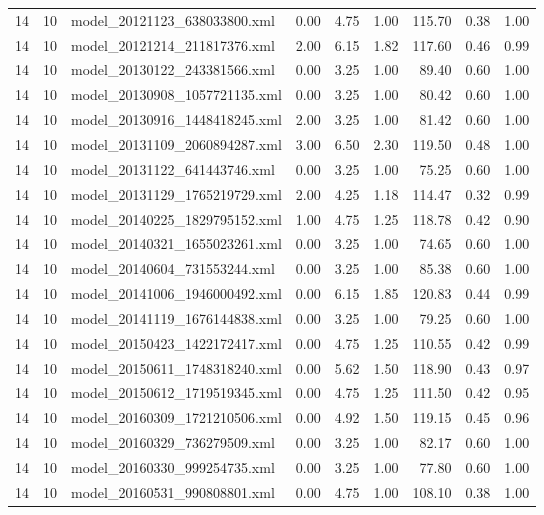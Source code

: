 \begin{table}[ht]
\begin{tabular}{rrlrrrrrr}
   14 &  10 & model\_20121123\_638033800.xml & 0.00 & 4.75 & 1.00 & 115.70 & 0.38 & 1.00 \\ 
   14 &  10 & model\_20121214\_211817376.xml & 2.00 & 6.15 & 1.82 & 117.60 & 0.46 & 0.99 \\ 
   14 &  10 & model\_20130122\_243381566.xml & 0.00 & 3.25 & 1.00 & 89.40 & 0.60 & 1.00 \\ 
   14 &  10 & model\_20130908\_1057721135.xml & 0.00 & 3.25 & 1.00 & 80.42 & 0.60 & 1.00 \\ 
   14 &  10 & model\_20130916\_1448418245.xml & 2.00 & 3.25 & 1.00 & 81.42 & 0.60 & 1.00 \\ 
   14 &  10 & model\_20131109\_2060894287.xml & 3.00 & 6.50 & 2.30 & 119.50 & 0.48 & 1.00 \\ 
   14 &  10 & model\_20131122\_641443746.xml & 0.00 & 3.25 & 1.00 & 75.25 & 0.60 & 1.00 \\ 
   14 &  10 & model\_20131129\_1765219729.xml & 2.00 & 4.25 & 1.18 & 114.47 & 0.32 & 0.99 \\ 
   14 &  10 & model\_20140225\_1829795152.xml & 1.00 & 4.75 & 1.25 & 118.78 & 0.42 & 0.90 \\ 
   14 &  10 & model\_20140321\_1655023261.xml & 0.00 & 3.25 & 1.00 & 74.65 & 0.60 & 1.00 \\ 
   14 &  10 & model\_20140604\_731553244.xml & 0.00 & 3.25 & 1.00 & 85.38 & 0.60 & 1.00 \\ 
   14 &  10 & model\_20141006\_1946000492.xml & 0.00 & 6.15 & 1.85 & 120.83 & 0.44 & 0.99 \\ 
   14 &  10 & model\_20141119\_1676144838.xml & 0.00 & 3.25 & 1.00 & 79.25 & 0.60 & 1.00 \\ 
   14 &  10 & model\_20150423\_1422172417.xml & 0.00 & 4.75 & 1.25 & 110.55 & 0.42 & 0.99 \\ 
   14 &  10 & model\_20150611\_1748318240.xml & 0.00 & 5.62 & 1.50 & 118.90 & 0.43 & 0.97 \\ 
   14 &  10 & model\_20150612\_1719519345.xml & 0.00 & 4.75 & 1.25 & 111.50 & 0.42 & 0.95 \\ 
   14 &  10 & model\_20160309\_1721210506.xml & 0.00 & 4.92 & 1.50 & 119.15 & 0.45 & 0.96 \\ 
   14 &  10 & model\_20160329\_736279509.xml & 0.00 & 3.25 & 1.00 & 82.17 & 0.60 & 1.00 \\ 
   14 &  10 & model\_20160330\_999254735.xml & 0.00 & 3.25 & 1.00 & 77.80 & 0.60 & 1.00 \\ 
   14 &  10 & model\_20160531\_990808801.xml & 0.00 & 4.75 & 1.00 & 108.10 & 0.38 & 1.00 \\ 

\end{tabular}
\end{table}

